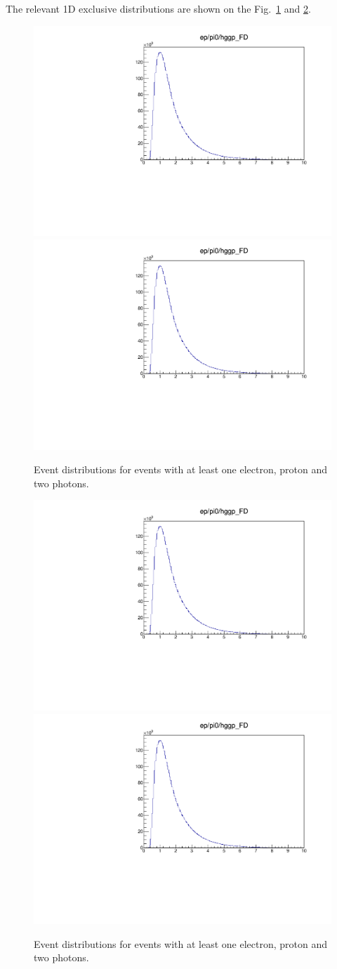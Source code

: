     The relevant 1D exclusive distributions are shown on the Fig.~\ref{fig:rawexclusive1} and \ref{fig:rawexclusive2}.
    
    \begin{figure}[hbt]
    	\centering
    	\includegraphics[page=4,width=0.47\linewidth]{Chapters/Ch4-BaseAnalysis/1_Event_Selection_Cuts/figures/eppi0.exclusive.pdf}
    	\includegraphics[page=5,width=0.47\linewidth]{Chapters/Ch4-BaseAnalysis/1_Event_Selection_Cuts/figures/eppi0.exclusive.pdf}
    	\caption{Event distributions for events with at least one electron, proton and two photons.}
    	\label{fig:rawexclusive1}
    \end{figure}
    
    \begin{figure}[hbt]
    	\centering
    	\includegraphics[page=6,width=0.47\linewidth]{Chapters/Ch4-BaseAnalysis/1_Event_Selection_Cuts/figures/eppi0.exclusive.pdf}
    	\includegraphics[page=8,width=0.47\linewidth]{Chapters/Ch4-BaseAnalysis/1_Event_Selection_Cuts/figures/eppi0.exclusive.pdf}
    	\caption{Event distributions for events with at least one electron, proton and two photons.}
    	\label{fig:rawexclusive2}
    \end{figure}
    
